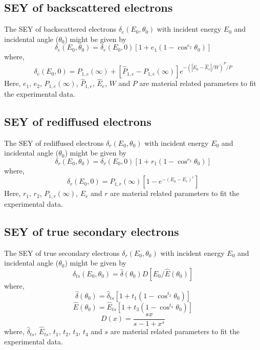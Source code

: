 \documentclass[a4paper,11pt]{article}
\begin{document}
\subsection {SEY of backscattered electrons}
The SEY of backscattered electrons $\delta_e(E_0,\theta_0)$ with incident energy $E_0$ and  incidental angle ($\theta_0$) might be given by 
\begin{equation*}
\delta_e(E_0,\theta_0) = \delta_e(E_0,0)[1+e_1(1-\cos^{e_2}{\theta_0})]
\end{equation*}
where,
\begin{equation*}
\delta_e(E_0,0) = P_{1,e}(\infty)+[\hat{P}_{1,e}-P_{1,e}(\infty)]e^{-(\left|E_0-\hat{E}_e\right|/W)^P/P}
\end{equation*}
Here, $e_1$, $e_2$, $ P_{1,e}(\infty)$, $\hat{P}_{1,e}$, $\hat{E}_e$, $W$ and $P$ are material related parameters to fit the experimental data.
\subsection {SEY of rediffused electrons}
The SEY of rediffused electrons $\delta_r(E_0,\theta_0)$ with incident energy $E_0$ and  incidental angle ($\theta_0$) might be given by 
\begin{equation*}
\delta_r(E_0,\theta_0) =  \delta_r(E_0,0)[1+r_1(1-\cos^{r_2}{\theta_0})]
\end{equation*}
where,
\begin{equation*}
\delta_r(E_0,0) = P_{1,r}(\infty)[1-e^{-(E_0-E_r)^r}]
\end{equation*}
Here, $r_1$, $r_2$, $ P_{1,r}(\infty)$, $E_r$ and $r$ are material related parameters to fit the experimental data.
\subsection {SEY of true secondary electrons}
The SEY of true secondary electrons $\delta_r(E_0,\theta_0)$ with incident energy $E_0$ and incidental angle ($\theta_0$) might be given by 
\begin{equation*}
\delta_{ts}(E_0,\theta_0) = \hat{\delta}(\theta_0)D[E_0/\hat{E}(\theta_0)]
\end{equation*}
where, 
\begin{equation*}
\hat{\delta}(\theta_0) = \hat{\delta}_{ts}[1+t_1(1-\cos^{t_2}{\theta_0})]
\end{equation*}
\begin{equation*}
\hat{E}(\theta_0) = \hat{E}_{ts}[1+t_3(1-\cos^{t_4}{\theta_0})]
\end{equation*}
\begin{equation*}
D(x) = \frac{sx}{s-1+x^s}
\end{equation*}
where, $ \hat{\delta}_{ts} $, $ \hat{E}_{ts} $, $t_1$, $t_2$, $t_3$, $t_4$ and $s$ are material related parameters to fit the experimental data.
\end{document}
